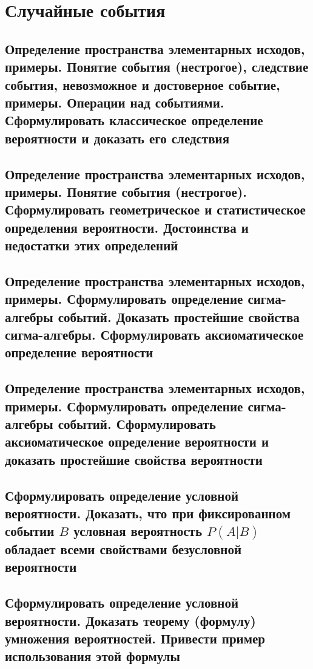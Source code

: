 \documentclass[a4paper]{report}
\begin{document}
\chapter{Случайные события}

\section{Определение пространства элементарных исходов, примеры.
Понятие события (нестрогое), следствие события, невозможное и достоверное событие, примеры.
Операции над событиями.
Сформулировать классическое определение вероятности и доказать его следствия}

\section{Определение пространства элементарных исходов, примеры.
Понятие события (нестрогое).
Сформулировать геометрическое и статистическое определения вероятности.
Достоинства и недостатки этих определений}

\section{Определение пространства элементарных исходов, примеры.
Сформулировать определение сигма-алгебры событий.
Доказать простейшие свойства сигма-алгебры.
Сформулировать аксиоматическое определение вероятности}

\section{Определение пространства элементарных исходов, примеры.
Сформулировать определение сигма-алгебры событий.
Сформулировать аксиоматическое определение вероятности и доказать простейшие свойства вероятности}

\section{Сформулировать определение условной вероятности.
Доказать, что при фиксированном событии $B$ условная вероятность $P(A|B)$ обладает всеми свойствами безусловной вероятности}

\section{Сформулировать определение условной вероятности.
Доказать теорему (формулу) умножения вероятностей.
Привести пример использования этой формулы}
\end{document}
